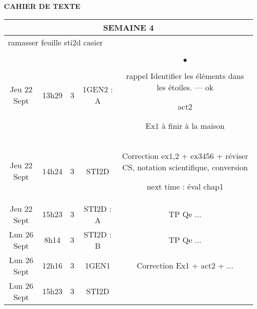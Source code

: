 \documentclass[10pt]{article}
\newcommand{\mypage}[1]{ 
		\begin{minipage}[c]{0.45\textwidth}
			\vspace{5pt}
			{#1}
			\vspace{5pt}
		\end{minipage}
}
\newcommand{\seancea}{	\mypage{
	\begin{list}{$\bullet$}{}
		\item rappel Identifier les éléments dans les étoiles. — ok
		\item act2
		\item Ex1 à finir à la maison
	\end{list}
}}
\newcommand{\seanceb}{	\mypage{ Correction ex1,2 + ex3456 + réviser CS, notation
scientifique, conversion

next time : éval chap1}}
\newcommand{\seancec}{	\mypage{TP Qe ...}}
\newcommand{\seanced}{	\mypage{TP Qe ...}}
\newcommand{\seancee}{	\mypage{}}
\newcommand{\seancef}{	\mypage{Correction Ex1 + act2 + ...}}
\newcommand{\seanceg}{	\mypage{}}
\newcommand{\seanceh}{	\mypage{}}
\begin{document}
\begin{center}
	\textbf{CAHIER DE TEXTE}
\end{center}

\setlength{\tabcolsep}{13pt}
\renewcommand{\arraystretch}{2.5}
\begin{longtable}{@{}|c|c|c|c|c|@{}} \toprule
	\midrule\multicolumn{5}{||c||}{SEMAINE 4}           \\\midrule
	\multicolumn{5}{|l|}{ramasser feuille sti2d casier} \\\midrule
	Jeu 22 Sept & 13h29 & 3 & 1GEN2 : A & \seancea      \\\midrule
	Jeu 22 Sept & 14h24 & 3 & STI2D     & \seanceb      \\\midrule
	Jeu 22 Sept & 15h23 & 3 & STI2D : A & \seancec      \\\midrule\midrule
	Lun 26 Sept & 8h14  & 3 & STI2D : B & \seanced      \\\midrule
	Lun 26 Sept & 12h16 & 3 & 1GEN1     & \seancef      \\\midrule
	Lun 26 Sept & 15h23 & 3 & STI2D     & \seanceg      \\\midrule


	\bottomrule
\end{longtable}
\end{document}
